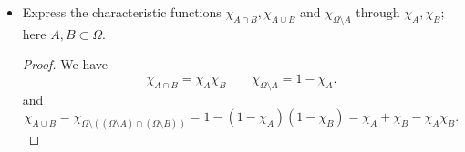 \begin{itemize}
\begin{proof}
	Now we have a lower bound, and it remains to get an upper bound. Fix $\varepsilon>0$ and let $N$ be such that 
	\[
		\sum_{n=N}^{\infty} 2^{-n} < \varepsilon
	.\] 
	We pick $I_n$ such that $R \cap A \subset \cup_n I_n$, and $\{r_n: n \le  N\} \cap A^c$ is not covered by any $I_n$. This is possible because: we can just use $\mathbb{R} \setminus \left( \{r_n: n \le N\} \cap A^c \right)$ as our cover, which is disjoint union of at most $N + 1$ open intervals that satisfies the two properties. 
	Now we have
	\begin{align*}
		\sum_{j=1}^{\infty} |I_j|
		&= \sum_{j=1}^{\infty} \sum_{r_n \in I_j} 2^{-n} \\
		&= \sum_{r_n \in A} 2^{-n} + \sum_{j=1}^{\infty} \sum_{r_n \in I_j \setminus A} 2^{-n} \\
		&\le \sum_{r_n \in A}2^{-n} + \sum_{r_n \not\in A, n > N} 2^{-n}\\
		&\le \sum_{r_n \in A}2^{-n} + \sum_{n> N} 2^{-n} \\
		&< \sum_{r_n \in A}2^{-n} + \varepsilon
	.\end{align*}
	Therefore
	\[
		m^*_g(A) = \operatorname{inf} 
		\left\{ \sum_{j=1}^{\infty} |I_j|: A \subset \bigcup_{j \in \mathbb{N}} I_j\right\}
		= \sum_{r_n \in A} 2^{-n}
	.\] 
	Now we discuss what $A$ are measurable. 

	Any subset of $\mathbb{R}$ is measurable in this sense. Consider any $A \subset \mathbb{R}$ and $X \subset \mathbb{R}$. Now we have
	\[
		A = \left( A \cap X \right)  \cup \left( A \setminus X \right) 
	.\] 
	Thus
	\[
		R \cap A = \left( R \cap \left( A \cap X \right)  \right)  \cup \left( R \cap (A \setminus X) \right)  
	.\] 
	But this directly implies
	\[
		\sum_{r_n \in A} 2^{-n} = \sum_{r_n \in A \cap X} 2^{-n} + \sum_{r_n \in A \setminus X} 2^{-n}
	.\] 
	which reads as
	\[
		m^*(A) = m^*(A \cap X) + m^*(A \setminus X)
	.\] 
	This is precisely the measurability criterion.
\end{proof}
\newpage

	\item Express the characteristic functions $\chi_{ A \cap B}, \chi_{A \cup B}$ and $\chi_{\Omega \setminus A}$ through $\chi_A, \chi_B$; here $A, B \subset \Omega$.
\begin{proof}
	We have
	\[
		\chi_{A \cap B} = \chi_A \chi_B \qquad
		\chi_{\Omega \setminus A} = 1 - \chi_A
	.\] 
	and
	\[
		\chi_{A \cup B} = \chi_{\Omega\setminus \left( \left( \Omega \setminus A \right) \cap (\Omega \setminus B) \right) }
		= 1 - (1 - \chi_A) (1 - \chi_B)
		= \chi_A + \chi_B - \chi_A\chi_B
	.\] 
\end{proof}


\end{itemize}
